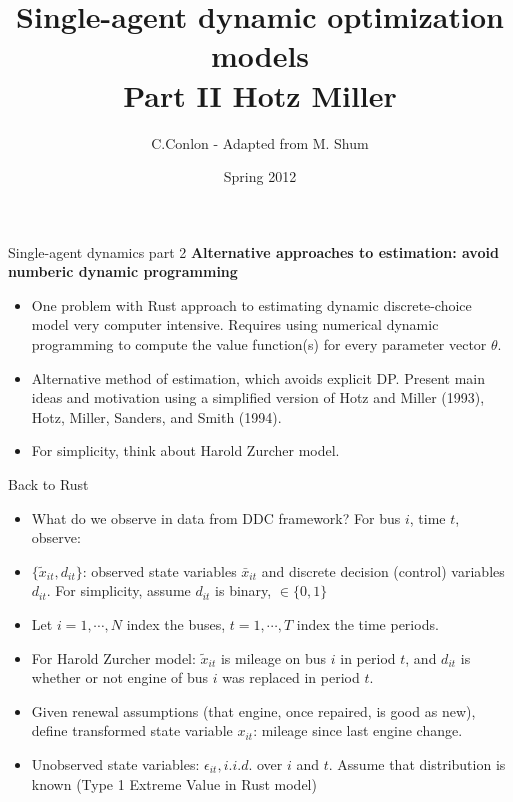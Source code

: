 \documentclass[aspectratio=169,11pt]{beamer}
\title [Single-agent dynamic optimization models]{Single-agent dynamic optimization models\\
Part II Hotz Miller}
\author{C.Conlon - Adapted from M. Shum}
\institute{Grad IO III}
\date{Spring 2012}
\begin{document}
\begin{frame}
\titlepage
\end{frame}


\begin{frame}{Single-agent dynamics part 2}
\textbf{Alternative approaches to estimation: avoid numberic dynamic programming} \\
\begin{itemize}
\item One problem with Rust approach to estimating dynamic discrete-choice model very computer intensive. Requires using numerical dynamic programming to compute the value function(s) for every parameter vector $\theta$.
\item Alternative method of estimation, which avoids explicit DP. Present main ideas and motivation using a simplified version of Hotz and Miller (1993), Hotz, Miller, Sanders, and Smith (1994). \\
\item For simplicity, think about Harold Zurcher model.
\end{itemize}
\end{frame}


\begin{frame}{Back to Rust}
\begin{itemize}
\item What do we observe in data from DDC framework? For bus $i$, time $t$, observe:
\item $\{ \tilde x_{it}, d_{it}\}$: observed state variables $\bar x_{it}$ and discrete decision (control) variables $d_{it}$. For simplicity, assume $d_{it}$ is binary, $\in \{0,1\}$
\item Let $i=1, \cdots , N$ index the buses, $t=1, \cdots, T$ index the time periods. 
\item For Harold Zurcher model: $\tilde x_{it}$ is mileage on bus $i$ in period $t$, and $d_{it}$ is whether or not engine of bus $i$ was replaced in period $t$. 
\item Given renewal assumptions (that engine, once repaired, is good as new), define transformed state variable $x_{it}$: mileage since last engine change. 
\item Unobserved state variables: $\epsilon_{it}, i.i.d.$ over $i$ and $t$. Assume that distribution is known (Type 1 Extreme Value in Rust model)
\end{itemize}
\end{frame}
\end{document}
